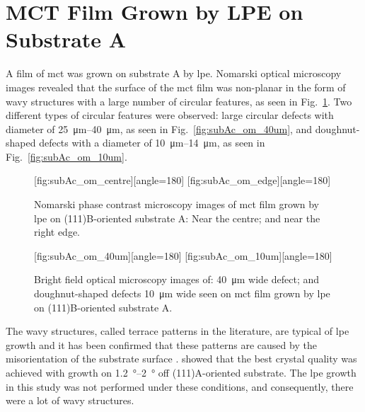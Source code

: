 \clearpage
\section{MCT Film Grown by LPE on Substrate A}\label{sec:subAc}

A film of \acl{mct} was grown on substrate A by \ac{lpe}. Nomarski optical microscopy images revealed that the surface of the \ac{mct} film was non-planar in the form of wavy structures with a large number of circular features, as seen in Fig.~\ref{fig:subAc_om}. Two different types of circular features were observed: large circular defects with diameter of \SIrange{25}{40}{\micro\metre}, as seen in Fig.~\ref{fig:subAc_om_40um}, and doughnut-shaped defects with a diameter of \SIrange{10}{14}{\micro\metre}, as seen in Fig.~\ref{fig:subAc_om_10um}. %

\begin{figure}[htbp]
    \centering
    [fig:subAc_om_centre][angle=180]
    \hfill
    [fig:subAc_om_edge][angle=180]
    \caption[Nomarski phase contrast microscopy images of \ac{mct} film grown by \ac{lpe} on substrate A.]{Nomarski phase contrast microscopy images of \ac{mct} film grown by \ac{lpe} on (111)B-oriented substrate A:  Near the centre; and  near the right edge.}
    \label{fig:subAc_om}
\end{figure}

\begin{figure}[htbp]
    \centering
    [fig:subAc_om_40um][angle=180]
    \hfill
    [fig:subAc_om_10um][angle=180]
    \caption[Bright field optical microscopy images of defects seen on \ac{mct} film grown by \ac{lpe} on substrate A.]{Bright field optical microscopy images of:  \SI{40}{\micro\metre} wide defect; and  doughnut-shaped defects \SI{10}{\micro\metre} wide seen on \ac{mct} film grown by \ac{lpe} on (111)B-oriented substrate A.}
    \label{fig:subAc_om_40umand10um}
\end{figure}

The wavy structures, called terrace patterns in the literature, are typical of \ac{lpe} growth and it has been confirmed that these patterns are caused by the misorientation of the substrate surface \citep{benz1980crystals, parker1988terracing}. \citet{li1998crystallinity} showed that the best crystal quality was achieved with growth on \SIrange{1.2}{2}{\degree} off (111)A-oriented substrate. The \ac{lpe} growth in this study was not performed under these conditions, and consequently, there were a lot of wavy structures.

